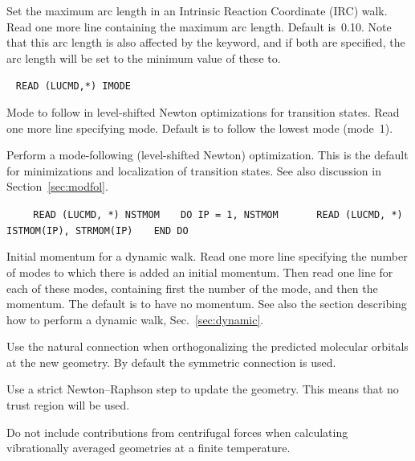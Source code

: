 \begin{description}
Set the maximum arc length in an Intrinsic Reaction Coordinate (IRC)
walk. Read one more
line containing the maximum arc length.
Default is~0.10. Note that this arc length is also affected by the
 keyword, and if both are specified, the arc length will
be set to the minimum value of these to.

\item[\Key{MODE}]\verb| |\newline
\verb|READ (LUCMD,*) IMODE|

Mode to follow in level-shifted Newton optimizations for transition
states.  Read one more line specifying
mode. Default is to follow
the lowest mode (mode~1).

\item[\Key{MODFOL}] Perform a mode-following (level-shifted
Newton) optimization. This is the default for minimizations and
localization of transition states. See also discussion in
Section~\ref{sec:modfol}.

\item[\Key{MOMENT}]\verb| |\newline
\verb|   READ (LUCMD, *) NSTMOM|\newline
\verb|   DO IP = 1, NSTMOM|\newline
\verb|      READ (LUCMD, *) ISTMOM(IP), STRMOM(IP)|\newline
\verb|   END DO|

Initial momentum for a dynamic walk.
Read one more line specifying
the number of modes to which there is added an initial momentum. Then
read one line for each of these modes, containing first the number of
the mode, and then the momentum. The default is to have no momentum.
See also the section describing how to perform a dynamic
walk, Sec.~\ref{sec:dynamic}.

\item[\Key{NATCON}] Use the natural connection when orthogonalizing
the predicted molecular orbitals at the new geometry. By default the
symmetric connection is used.

\item[\Key{NEWTON}] Use a strict
Newton--Raphson step to update
the geometry. This means that no trust region will be used.

\item[\Key{NO CENTRIFUGAL FORCES}] Do not include contributions from
centrifugal forces when calculating vibrationally averaged geometries
at a finite temperature.


\end{description}

